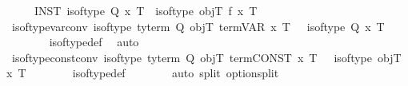 \begin{isabellebody}
\ \ \ \ \ INST{\isacharcolon}{\kern0pt}\ {\isachardoublequoteopen}is{\isacharunderscore}{\kern0pt}of{\isacharunderscore}{\kern0pt}type\ Q\ x\ T\ {\isasymLongrightarrow}\ is{\isacharunderscore}{\kern0pt}of{\isacharunderscore}{\kern0pt}type\ objT\ {\isacharparenleft}{\kern0pt}f\ x{\isacharparenright}{\kern0pt}\ T{\isachardoublequoteclose}\isanewline
\ \ \isanewline
\isanewline
\ \ \ \ \isamarkupfalse%
\ is{\isacharunderscore}{\kern0pt}of{\isacharunderscore}{\kern0pt}type{\isacharunderscore}{\kern0pt}var{\isacharunderscore}{\kern0pt}conv{\isacharcolon}{\kern0pt}\ {\isachardoublequoteopen}is{\isacharunderscore}{\kern0pt}of{\isacharunderscore}{\kern0pt}type\ {\isacharparenleft}{\kern0pt}ty{\isacharunderscore}{\kern0pt}term\ Q\ objT{\isacharparenright}{\kern0pt}\ {\isacharparenleft}{\kern0pt}term{\isachardot}{\kern0pt}VAR\ x{\isacharparenright}{\kern0pt}\ T\ \ {\isasymlongleftrightarrow}\ is{\isacharunderscore}{\kern0pt}of{\isacharunderscore}{\kern0pt}type\ Q\ x\ T{\isachardoublequoteclose}\isanewline
%
\isadelimproof
\ \ \ \ \ \ %
\endisadelimproof
%
\isatagproof
{}\isamarkupfalse%
\ is{\isacharunderscore}{\kern0pt}of{\isacharunderscore}{\kern0pt}type{\isacharunderscore}{\kern0pt}def\ \isamarkupfalse%
\ {\isacharparenleft}{\kern0pt}auto{\isacharparenright}{\kern0pt}%
\endisatagproof
{\isafoldproof}%
%
\isadelimproof
\isanewline
%
\endisadelimproof
\isanewline
\ \ \ \ \isamarkupfalse%
\ is{\isacharunderscore}{\kern0pt}of{\isacharunderscore}{\kern0pt}type{\isacharunderscore}{\kern0pt}const{\isacharunderscore}{\kern0pt}conv{\isacharcolon}{\kern0pt}\ {\isachardoublequoteopen}is{\isacharunderscore}{\kern0pt}of{\isacharunderscore}{\kern0pt}type\ {\isacharparenleft}{\kern0pt}ty{\isacharunderscore}{\kern0pt}term\ Q\ objT{\isacharparenright}{\kern0pt}\ {\isacharparenleft}{\kern0pt}term{\isachardot}{\kern0pt}CONST\ x{\isacharparenright}{\kern0pt}\ T\ \ {\isasymlongleftrightarrow}\ is{\isacharunderscore}{\kern0pt}of{\isacharunderscore}{\kern0pt}type\ objT\ x\ T{\isachardoublequoteclose}\isanewline
%
\isadelimproof
\ \ \ \ \ \ %
\endisadelimproof
%
\isatagproof
{}\isamarkupfalse%
\ is{\isacharunderscore}{\kern0pt}of{\isacharunderscore}{\kern0pt}type{\isacharunderscore}{\kern0pt}def\isanewline
\ \ \ \ \ \ \isamarkupfalse%
\ {\isacharparenleft}{\kern0pt}auto\ split{\isacharcolon}{\kern0pt}\ option{\isachardot}{\kern0pt}split{\isacharparenright}{\kern0pt}%
\endisatagproof
{\isafoldproof}%
%
\isadelimproof
\isanewline

\end{isabellebody}
